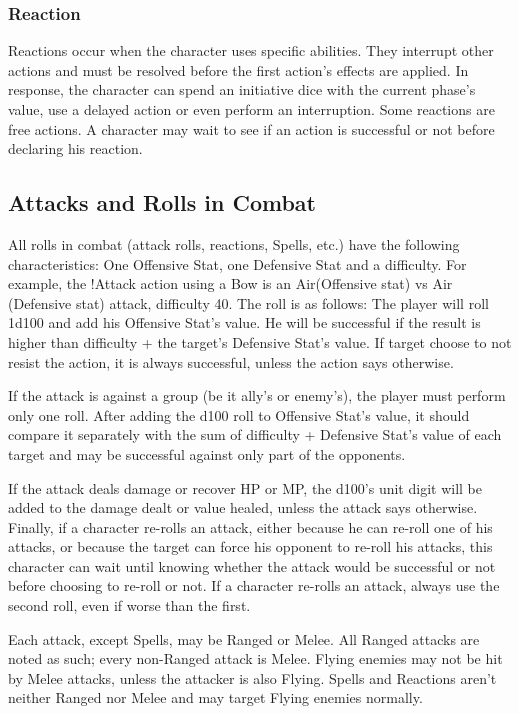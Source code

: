 \begin{multicols}{2}
\subsubsection{Reaction}
Reactions occur when the character uses
specific abilities. They interrupt other actions and
must be resolved before the first action’s effects
are applied. In response, the character can spend
an initiative dice with the current phase’s value,
use a delayed action or even perform an
interruption. Some reactions are free actions. A
character may wait to see if an action is successful
or not before declaring his reaction.

\subsection{Attacks and Rolls in Combat}
All rolls in combat (attack rolls, reactions,
Spells, etc.) have the following characteristics: One
Offensive Stat, one Defensive Stat and a difficulty.
For example, the !Attack action using a Bow is an
Air(Offensive stat) vs Air (Defensive stat) attack,
difficulty 40. The roll is as follows: The player will
roll 1d100 and add his Offensive Stat’s value. He
will be successful if the result is higher than
difficulty + the target’s Defensive Stat’s value. If
target choose to not resist the action, it is always
successful, unless the action says otherwise.

If the attack is against a group (be it ally’s
or enemy’s), the player must perform only one roll.
After adding the d100 roll to Offensive Stat’s value,
it should compare it separately with the sum of
difficulty + Defensive Stat’s value of each target
and may be successful against only part of the
opponents.

If the attack deals damage or recover HP or
MP, the d100’s unit digit will be added to the
damage dealt or value healed, unless the attack
says otherwise. Finally, if a character re-rolls an
attack, either because he can re-roll one of his
attacks, or because the target can force his
opponent to re-roll his attacks, this character can
wait until knowing whether the attack would be
successful or not before choosing to re-roll or not.
If a character re-rolls an attack, always use the
second roll, even if worse than the first.

Each attack, except Spells, may be Ranged
or Melee. All Ranged attacks are noted as such;
every non-Ranged attack is Melee. Flying enemies
may not be hit by Melee attacks, unless the
attacker is also Flying. Spells and Reactions aren't
neither Ranged nor Melee and may target Flying
enemies normally.


\end{multicols}
